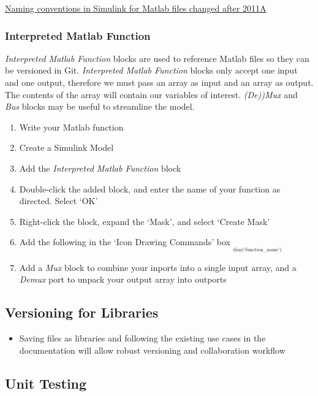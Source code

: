 \documentclass[]{book}
\providecommand{\tightlist}{%
  \setlength{\itemsep}{0pt}\setlength{\parskip}{0pt}}
\begin{document}
\href{http://www.goddardconsulting.ca/simulink-using-embedded-matlab.html}{Naming
conventions in Simulink for Matlab files changed after 2011A}

\subsubsection{Interpreted Matlab
Function}\label{interpreted-matlab-function}

\emph{Interpreted Matlab Function} blocks are used to reference Matlab
files so they can be versioned in Git. \emph{Interpreted Matlab
Function} blocks only accept one input and one output, therefore we must
pass an array as input and an array as output. The contents of the array
will contain our variables of interest. \emph{(De))Mux} and \emph{Bus}
blocks may be useful to streamline the model.

\begin{enumerate}
\def\labelenumi{\arabic{enumi}.}
\tightlist
\item
  Write your Matlab function
\item
  Create a Simulink Model
\item
  Add the \emph{Interpreted Matlab Function} block
\item
  Double-click the added block, and enter the name of your function as
  directed. Select `OK'
\item
  Right-click the block, expand the `Mask', and select `Create Mask'
\item
  Add the following in the `Icon Drawing Commands' box
  \textsubscript{\textsubscript{\textsubscript{ disp(`function\_name')
  }}}
\item
  Add a \emph{Mux} block to combine your inports into a single input
  array, and a \emph{Demux} port to unpack your output array into
  outports
\end{enumerate}

\subsection{Versioning for Libraries}\label{versioning-for-libraries}

\begin{itemize}
\tightlist
\item
  Saving files as libraries and following the existing use cases in the
  documentation will allow robust versioning and collaboration workflow
\end{itemize}

\subsection{Unit Testing}\label{unit-testing-1}
\end{document}
